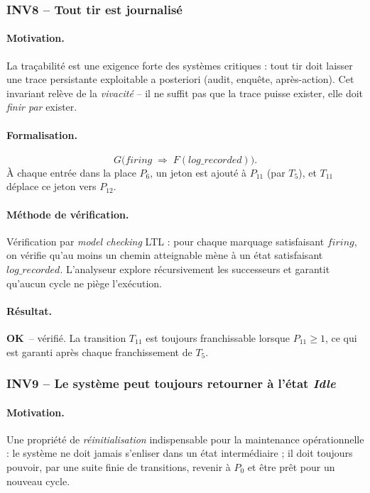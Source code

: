 \documentclass[11pt,a4paper]{article}
\newcommand{\OK}{\textcolor{green!50!black}{\textbf{OK}}}
\begin{document}
\subsubsection*{INV8 -- Tout tir est journalisé}

\paragraph{Motivation.}
La traçabilité est une exigence forte des systèmes critiques : tout tir
doit laisser une trace persistante exploitable a posteriori (audit,
enquête, après-action). Cet invariant relève de la \emph{vivacité} -- il ne
suffit pas que la trace puisse exister, elle doit \emph{finir par} exister.

\paragraph{Formalisation.}
\[
G\bigl(\textit{firing} \;\Longrightarrow\; F(\textit{log\_recorded})\bigr).
\]
À chaque entrée dans la place $P_6$, un jeton est ajouté à $P_{11}$
(par $T_5$), et $T_{11}$ déplace ce jeton vers $P_{12}$.

\paragraph{Méthode de vérification.}
Vérification par \emph{model checking} LTL : pour chaque marquage
satisfaisant $\textit{firing}$, on vérifie qu'au moins un chemin atteignable
mène à un état satisfaisant $\textit{log\_recorded}$. L'analyseur explore
récursivement les successeurs et garantit qu'aucun cycle ne piège l'exécution.

\paragraph{Résultat.}
\OK\ -- vérifié. La transition $T_{11}$ est toujours franchissable lorsque
$P_{11} \geq 1$, ce qui est garanti après chaque franchissement de $T_5$.

\subsubsection*{INV9 -- Le système peut toujours retourner à l'état \textit{Idle}}

\paragraph{Motivation.}
Une propriété de \emph{réinitialisation} indispensable pour la maintenance
opérationnelle : le système ne doit jamais s'enliser dans un état
intermédiaire ; il doit toujours pouvoir, par une suite finie de
transitions, revenir à $P_0$ et être prêt pour un nouveau cycle.
\end{document}
